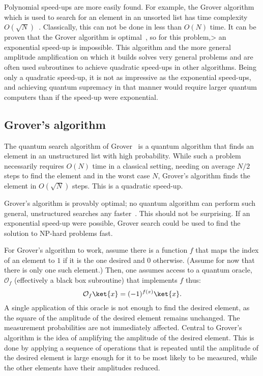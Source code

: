 
Polynomial speed-ups are more easily found.
For example, the Grover algorithm which is used to search for an element in an unsorted list has time complexity $O(\sqrt{N})$~\autocite{grover1996}.
Classically, this can not be done in less than $O(N)$ time.
It can be proven that the Grover algorithm is optimal~\autocite{zalka1999}, so for this problem,> an exponential speed-up is impossible.
This algorithm and the more general amplitude amplification on which it builds solves very general problems and are often used subroutines to achieve quadratic speed-ups in other algorithms.
Being only a quadratic speed-up, it is not as impressive as the exponential speed-ups, and achieving quantum supremacy in that manner would require larger quantum computers than if the speed-up were exponential.

\subsection{Grover's algorithm}
The quantum search algorithm of Grover~\autocite{grover1996} is a quantum algorithm that finds an element in an unstructured list with high probability.
While such a problem necessarily requires $O(N)$ time in a classical setting, needing on average $N/2$ steps to find the element and in the worst case $N$, Grover's algorithm finds the element in $O(\sqrt{N})$ steps.
This is a quadratic speed-up.

Grover's algorithm is provably optimal; no quantum algorithm can perform such general, unstructured searches any faster~\autocite{zalka1999}.
This should not be surprising.
If an exponential speed-up were possible, Grover search could be used to find the solution to NP-hard problems fast.

For Grover's algorithm to work, assume there is a function $f$ that maps the index of an element to $1$ if it is the one desired and $0$ otherwise.
(Assume for now that there is only one such element.)
Then, one assumes access to a quantum oracle, $\mathcal{O}_f$
(effectively a black box subroutine) that implements $f$ thus:
\begin{equation}
    \label{eq:grover_oracle}
    \mathcal{O}_f \ket{x} = (-1)^{f(x)} \ket{x}.
\end{equation}
A single application of this oracle is not enough to find the desired element, as the square of the amplitude of the desired element remains unchanged.
The measurement probabilities are not immediately affected.
Central to Grover's algorithm is the idea of amplifying the amplitude of the desired element.
This is done by applying a sequence of operations that is repeated until the amplitude of the desired element is large enough for it to be most likely to be measured, while the other elements have their amplitudes reduced.


